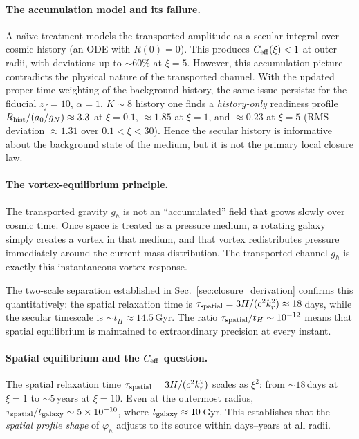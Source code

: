 \documentclass[11pt]{article}
\begin{document}
\paragraph{The accumulation model and its failure.}
A na\"{\i}ve treatment models the transported amplitude
as a secular integral over cosmic history (an ODE with
$R(0)=0$).  This produces $C_{\rm eff}(\xi)<1$ at outer
radii, with deviations up to $\sim 60\%$ at $\xi=5$.
However, this accumulation picture contradicts the
physical nature of the transported channel.
With the updated proper-time weighting of the background history,
the same issue persists: for the fiducial
$z_f=10$, $\alpha=1$, $K\sim 8$ history one finds a
\emph{history-only} readiness profile
$R_{\rm hist}/(a_0/g_N)\approx 3.3$ at $\xi=0.1$,
$\approx 1.85$ at $\xi=1$, and $\approx 0.23$ at $\xi=5$
(RMS deviation $\approx 1.31$ over $0.1<\xi<30$).
Hence the secular history is informative about the background state of
the medium, but it is not the primary local closure law.

\paragraph{The vortex-equilibrium principle.}
The transported gravity $g_h$ is not an ``accumulated''
field that grows slowly over cosmic time.  Once space is
treated as a pressure medium, a rotating galaxy simply
creates a vortex in that medium, and that vortex
redistributes pressure immediately around the current mass
distribution.  The transported channel $g_h$ is exactly
this instantaneous vortex response.

The two-scale separation established in
Sec.~\ref{sec:closure_derivation} confirms this
quantitatively: the spatial relaxation time is
$\tau_{\rm spatial}=3H/(c^2 k_r^2)\approx 18\,$days,
while the secular timescale is $\sim t_H\approx 14.5\,$Gyr.
The ratio $\tau_{\rm spatial}/t_H\sim 10^{-12}$ means
that spatial equilibrium is maintained to extraordinary
precision at every instant.

\paragraph{Spatial equilibrium and the $C_{\rm eff}$ question.}
The spatial relaxation time $\tau_{\rm spatial}=3H/(c^2 k_r^2)$
scales as $\xi^2$: from $\sim 18\,$days at $\xi=1$ to
$\sim 5\,$years at $\xi=10$.
Even at the outermost radius, $\tau_{\rm spatial}/t_{\rm galaxy}
\sim 5\times 10^{-10}$, where $t_{\rm galaxy}\approx 10\,$Gyr.
This establishes that the \emph{spatial profile shape} of
$\varphi_h$ adjusts to its source within days--years at all radii.
\end{document}

